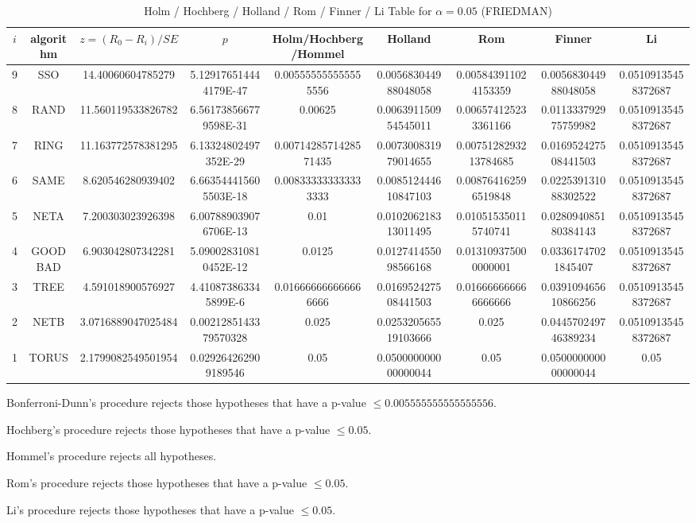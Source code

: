 \documentclass[a4paper,10pt]{article}
\begin{document}
\begin{landscape}
\begin{table}[!htp]
\centering\scriptsize
\caption{Holm / Hochberg / Holland / Rom / Finner / Li Table for $\alpha=0.05$ (FRIEDMAN)}
\begin{tabular}{ccccccccc}
$i$&algorithm&$z=(R_0 - R_i)/SE$&$p$&Holm/Hochberg/Hommel&Holland&Rom&Finner&Li\\
\hline
9& SSO&14.40060604785279&5.129176514444179E-47&0.005555555555555556&0.005683044988048058&0.005843911024153359&0.005683044988048058&0.05109135458372687\\
8& RAND&11.560119533826782&6.561738566779598E-31&0.00625&0.006391150954545011&0.006574125233361166&0.011333792975759982&0.05109135458372687\\
7& RING&11.163772578381295&6.13324802497352E-29&0.0071428571428571435&0.007300831979014655&0.0075128293213784685&0.016952427508441503&0.05109135458372687\\
6& SAME&8.620546280939402&6.663544415605503E-18&0.008333333333333333&0.008512444610847103&0.008764162596519848&0.022539131088302522&0.05109135458372687\\
5& NETA&7.200303023926398&6.007889039076706E-13&0.01&0.010206218313011495&0.010515350115740741&0.028094085180384143&0.05109135458372687\\
4& GOODBAD&6.903042807342281&5.090028310810452E-12&0.0125&0.012741455098566168&0.013109375000000001&0.03361747021845407&0.05109135458372687\\
3& TREE&4.591018900576927&4.410873863345899E-6&0.016666666666666666&0.016952427508441503&0.016666666666666666&0.039109465610866256&0.05109135458372687\\
2& NETB&3.0716889047025484&0.0021285143379570328&0.025&0.025320565519103666&0.025&0.044570249746389234&0.05109135458372687\\
1& TORUS&2.1799082549501954&0.029264262909189546&0.05&0.050000000000000044&0.05&0.050000000000000044&0.05\\
\hline
\end{tabular}
\end{table}
Bonferroni-Dunn's procedure rejects those hypotheses that have a p-value $\le0.005555555555555556$.


Hochberg's procedure rejects those hypotheses that have a p-value $\le0.05$.


Hommel's procedure rejects all hypotheses.


Rom's procedure rejects those hypotheses that have a p-value $\le0.05$.


Li's procedure rejects those hypotheses that have a p-value $\le0.05$.




\end{landscape}
\end{document}
